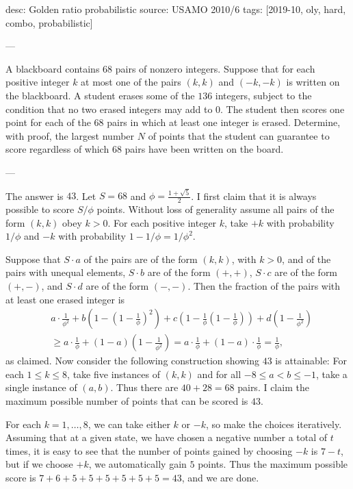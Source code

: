 desc: Golden ratio probabilistic
source: USAMO 2010/6
tags: [2019-10, oly, hard, combo, probabilistic]

---

A blackboard contains $68$ pairs of nonzero integers. Suppose that for each positive integer $k$ at most one of the pairs $(k,k)$ and $(-k,-k)$ is written on the blackboard. A student erases some of the $136$ integers, subject to the condition that no two erased integers may add to 0. The student then scores one point for each of the $68$ pairs in which at least one integer is erased. Determine, with proof, the largest number $N$ of points that the student can guarantee to score regardless of which $68$ pairs have been written on the board.

---

The answer is $43$. Let $S=68$ and $\phi=\frac{1+\sqrt5}2$. I first claim that it is always possible to score $S/\phi$ points. Without loss of generality assume all pairs of the form $(k,k)$ obey $k>0$. For each positive integer $k$, take $+k$ with probability $1/\phi$ and $-k$ with probability $1-1/\phi=1/\phi^2$.

Suppose that $S\cdot a$ of the pairs are of the form $(k,k)$, with $k>0$, and of the pairs with unequal elements, $S\cdot b$ are of the form $(+,+)$, $S\cdot c$ are of the form $(+,-)$, and $S\cdot d$ are of the form $(-,-)$. Then the fraction of the pairs with at least one erased integer is
\begin{align*}
    &a\cdot\frac1{\phi^2}+b\left(1-\left(1-\frac1\phi\right)^2\right)+c\left(1-\frac1\phi\left(1-\frac1\phi\right)\right)+d\left(1-\frac1{\phi^2}\right)\\
    &\ge a\cdot\frac1\phi+(1-a)\left(1-\frac1{\phi^2}\right)=a\cdot\frac1\phi+(1-a)\cdot\frac1\phi=\frac1\phi,
\end{align*}
as claimed. Now consider the following construction showing $43$ is attainable: For each $1\le k\le 8$, take five instances of $(k,k)$ and for all $-8\le a<b\le-1$, take a single instance of $(a,b)$. Thus there are $40+28=68$ pairs. I claim the maximum possible number of points that can be scored is $43$.

For each $k=1,\ldots,8$, we can take either $k$ or $-k$, so make the choices iteratively. Assuming that at a given state, we have chosen a negative number a total of $t$ times, it is easy to see that the number of points gained by choosing $-k$ is $7-t$, but if we choose $+k$, we automatically gain $5$ points. Thus the maximum possible score is $7+6+5+5+5+5+5+5=43$, and we are done.
